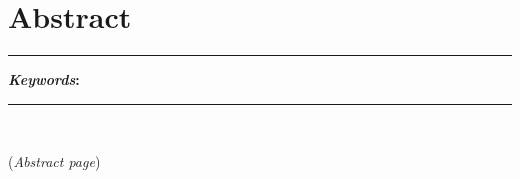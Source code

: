 \chapter*{Abstract} %
\noindent \rule{0.9\textwidth}{1.0pt} \newline
\noindent \textbf{\textit{Keywords}:} \newline
\noindent \rule{0.9\textwidth}{1.0pt}
\ \newline
\par
\linespread{1.3}
{\Huge{(\textit{Abstract page})}}
\clearpage %
